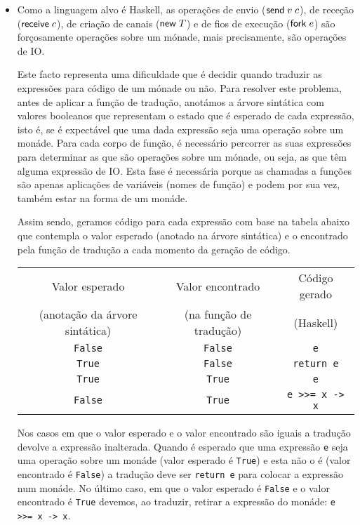 \begin{itemize}
\item Como a linguagem alvo é Haskell, as operações de envio ($\mathsf{send}\;v\; c$), de receção ($\mathsf{receive}\;c$), de criação de canais ($\mathsf{new}\;T$) e de fios de execução ($\mathsf{fork}\;e$) são forçosamente operações sobre um mónade, mais precisamente, são operações de IO.

Este facto representa uma dificuldade que é decidir quando traduzir as expressões para código de um mónade ou não. 
Para resolver este problema, antes de aplicar a função de tradução, anotámos a árvore sintática com valores booleanos que representam o estado que é esperado de cada expressão, isto é, se é expectável que uma dada expressão seja uma operação sobre um monáde.
Para cada corpo de função, é necessário percorrer as suas expressões para determinar as que são operações sobre um mónade, ou seja, as que têm alguma expressão de IO. Esta fase é necessária porque as chamadas a funções são apenas aplicações de variáveis (nomes de função) e podem por sua vez, também estar na forma de um monáde.

Assim sendo, geramos código para cada expressão com base na tabela abaixo que contempla o valor esperado (anotado na árvore sintática) e o encontrado pela função de tradução a cada momento da geração de código.

\begin{table}
\begin{center}
  \begin{tabular}[ht!]{| c | c | c |}
    \hline  
    \quad Valor esperado \quad&\quad Valor encontrado \quad&\quad Código gerado \quad\\
    \quad (anotação da árvore sintática) \quad&\quad (na função de tradução) \quad& (Haskell) \quad\\\hline
    \lstinline|False| & \lstinline|False| & \lstinline|e| \\
    \lstinline|True| & \lstinline|False| & \lstinline|return e| \\
    \lstinline|True| & \lstinline|True| & \lstinline|e| \\
    \lstinline|False| & \lstinline|True| & \lstinline|e >>= x -> x| \\
    \hline
  \end{tabular}
  \label{tab:monad}
\end{center}
\end{table}

Nos casos em que o valor esperado e o valor encontrado são iguais a tradução devolve a expressão inalterada. Quando é esperado que uma expressão \lstinline|e| seja uma operação sobre um monáde (valor esperado é \lstinline|True|) e esta não o é (valor encontrado é \lstinline|False|) a tradução deve ser \lstinline"return e" para colocar a expressão num monáde. No último caso, em que o valor esperado é \lstinline|False| e o valor encontrado é \lstinline|True| devemos, ao traduzir, retirar a expressão do monáde: \lstinline"e >>= x -> x".


\end{itemize}
